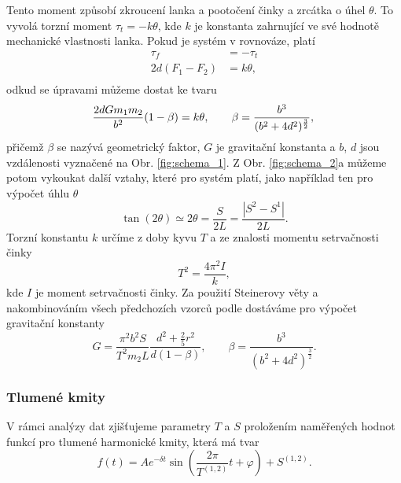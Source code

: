 \documentclass[english]{article}
\begin{document}
			Tento moment způsobí zkroucení lanka a pootočení činky a zrcátka o úhel $\theta$. To vyvolá torzní moment $\tau_t = -k\theta$, kde $k$ je konstanta zahrnující ve své hodnotě mechanické vlastnosti lanka. Pokud je systém v rovnováze, platí 
			\begin{equation}\label{odvozeni}
			\begin{aligned}
			\tau_{f}&=-\tau_{t}\\
			2d(F_{1}-F_{2})&=k\theta,\\
			\end{aligned}
			\end{equation}
			odkud se úpravami můžeme dostat ke tvaru
			\begin{equation}
			\frac{2dG m_{1}m_{2}}{b^2}(1-\beta)=k\theta, \qquad \beta = \frac{b^3}{(b^2+4d^2)^\frac{3}{2}},\\
			\end{equation}		
			přičemž $\beta$ se nazývá geometrický faktor, $G$ je gravitační konstanta a $b$, $d$ jsou vzdálenosti vyznačené na Obr. \ref{fig:schema_1}. Z Obr. \ref{fig:schema_2}a můžeme potom vykoukat další vztahy, které pro systém platí, jako například ten pro výpočet úhlu $\theta$
			\begin{equation}\label{1}
			\tan(2\theta)\simeq 2\theta = \frac{S}{2L}=\frac{|S^2-S^1|}{2L}.
			\end{equation}
			Torzní konstantu $k$ určíme z doby kyvu $T$ a ze znalosti momentu setrvačnosti činky
			\begin{equation}\label{2}
			T^2=\frac{4\pi^2I}{k}, %
			\end{equation}
			kde $I$ je moment setrvačnosti činky. Za použití Steinerovy věty a nakombinováním všech předchozích vzorců podle \cite{bib:zadani} dostáváme pro výpočet gravitační konstanty 
			\begin{equation}\label{G}
			G=\frac{\pi^2b^2S}{T^2m_{2}L}\frac{d^2+\frac{2}{5}r^2}{d(1-\beta)}, \qquad \beta = \frac{b^3}{(b^2+4d^2)^\frac{3}{2}}.
			\end{equation}	
		
		\subsubsection{Tlumené kmity}
			V rámci analýzy dat zjišťujeme parametry $T$ a $S$ proložením naměřených hodnot funkcí pro tlumené harmonické kmity, která má tvar 
			\begin{equation}\label{eq:fitfce}
				f(t)=Ae^{-\delta t}\sin\left(\frac{2\pi}{T^{(1, 2)}}t+\varphi \right) + S^{(1,2)}.
			\end{equation}
			
\end{document}
